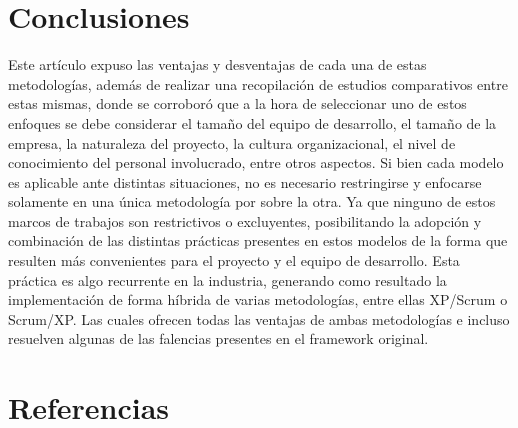 \documentclass[a4paper,10pt]{article}
\begin{document}
	\section{Conclusiones}
	Este artículo expuso las ventajas y desventajas de cada una de estas metodologías, además de realizar una recopilación de estudios comparativos entre estas mismas, donde se corroboró que a la hora de seleccionar uno de estos enfoques se debe considerar el tamaño del equipo de desarrollo, el tamaño de la empresa, la naturaleza del proyecto, la cultura organizacional, el nivel de conocimiento del personal involucrado, entre otros aspectos. Si bien cada modelo es aplicable ante distintas situaciones, no es necesario restringirse y enfocarse solamente en una única metodología por sobre la otra. Ya que ninguno de estos marcos de trabajos son restrictivos o excluyentes, posibilitando la adopción y combinación de las distintas prácticas presentes en estos modelos de la forma que resulten más convenientes para el proyecto y el equipo de desarrollo. Esta práctica es algo recurrente en la industria, generando como resultado la implementación de forma híbrida de varias metodologías, entre ellas XP/Scrum o Scrum/XP. Las cuales ofrecen todas las ventajas de ambas metodologías e incluso resuelven algunas de las falencias presentes en el framework original.
	
	\nocite{*}
	\section{Referencias}
	\printbibliography[heading=none]
\end{document}
